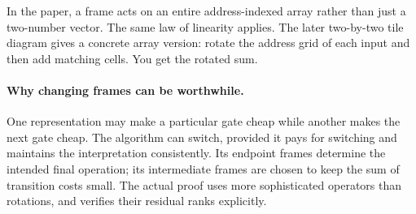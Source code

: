 In the paper, a frame acts on an entire address-indexed array rather than
just a two-number vector. The same law of linearity applies. The later
two-by-two tile diagram gives a concrete array version: rotate the address
grid of each input and then add matching cells. You get the rotated sum.

\paragraph{Why changing frames can be worthwhile.}
One representation may make a particular gate cheap while another makes
the next gate cheap. The algorithm can switch, provided it pays for switching
and maintains the interpretation consistently. Its endpoint frames determine
the intended final operation; its intermediate frames are chosen to keep
the sum of transition costs small. The actual proof uses more sophisticated
operators than rotations, and verifies their residual ranks explicitly.

